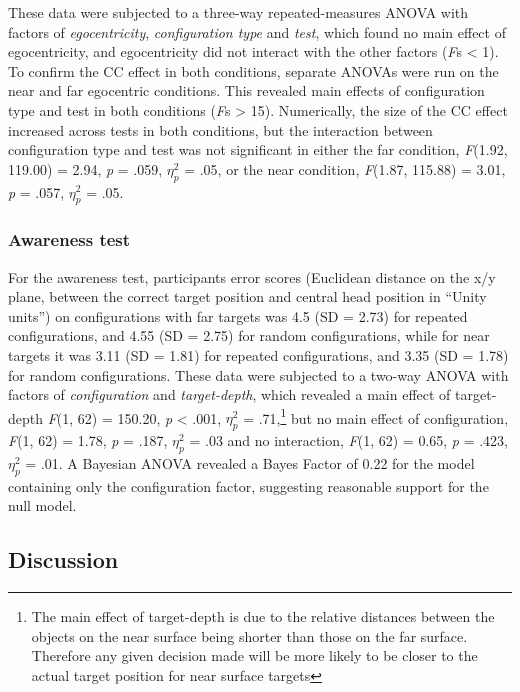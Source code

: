 \documentclass[
  english,
  man,floatsintext]{apa7}
\begin{document}
These data were subjected to a three-way repeated-measures ANOVA with factors of \emph{egocentricity}, \emph{configuration type} and \emph{test}, which found no main effect of egocentricity, and egocentricity did not interact with the other factors (\emph{F}s \textless{} 1). To confirm the CC effect in both conditions, separate ANOVAs were run on the near and far egocentric conditions. This revealed main effects of configuration type and test in both conditions (\emph{F}s \textgreater{} 15). Numerically, the size of the CC effect increased across tests in both conditions, but the interaction between configuration type and test was not significant in either the far condition, \emph{F}(1.92, 119.00) = 2.94, \emph{p} = .059, \(\eta^2_p\) = .05, or the near condition, \emph{F}(1.87, 115.88) = 3.01, \emph{p} = .057, \(\eta^2_p\) = .05.

\hypertarget{awareness-test}{%
\subsubsection{Awareness test}\label{awareness-test}}

For the awareness test, participants error scores (Euclidean distance on the x/y plane, between the correct target position and central head position in ``Unity units'') on configurations with far targets was 4.5 (SD = 2.73) for repeated configurations, and 4.55 (SD = 2.75) for random configurations, while for near targets it was 3.11 (SD = 1.81) for repeated configurations, and 3.35 (SD = 1.78) for random configurations. These data were subjected to a two-way ANOVA with factors of \emph{configuration} and \emph{target-depth}, which revealed a main effect of target-depth \emph{F}(1, 62) = 150.20, \emph{p} \textless{} .001, \(\eta^2_p\) = .71,\footnote{The main effect of target-depth is due to the relative distances between the objects on the near surface being shorter than those on the far surface. Therefore any given decision made will be more likely to be closer to the actual target position for near surface targets} but no main effect of configuration, \emph{F}(1, 62) = 1.78, \emph{p} = .187, \(\eta^2_p\) = .03 and no interaction, \emph{F}(1, 62) = 0.65, \emph{p} = .423, \(\eta^2_p\) = .01. A Bayesian ANOVA revealed a Bayes Factor of 0.22 for the model containing only the configuration factor, suggesting reasonable support for the null model.

\hypertarget{discussion-1}{%
\subsection{Discussion}\label{discussion-1}}
\end{document}
